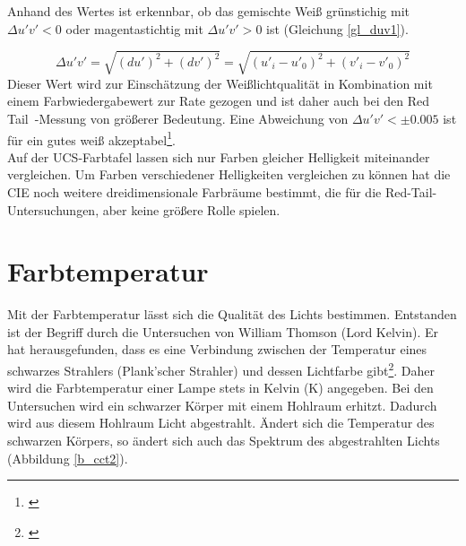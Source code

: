 \noindent Anhand des Wertes ist erkennbar, ob das gemischte Weiß grünstichig mit $\Delta u'v' < 0$ oder magentastichtig mit $\Delta u'v' > 0$ ist (Gleichung \ref{gl_duv1}).

\begin{equation}\label{gl_duv1}
		\Delta u'v'=\sqrt{(du')^{2}+(dv')^{2}}=\sqrt{(u'_{i}-u'_{0})^{2}+(v'_{i}-v'_{0})^{2}}
\end{equation}
Dieser Wert wird zur Einschätzung der Weißlichtqualität in Kombination mit einem Farbwiedergabewert zur Rate gezogen und ist daher auch bei den \glqq Red Tail\grqq\ -Messung von größerer Bedeutung. Eine Abweichung von $\Delta u'v' < \pm 0.005$ ist für ein gutes weiß akzeptabel\footnote{\cite{ohno}}.\\
Auf der UCS-Farbtafel lassen sich nur Farben gleicher Helligkeit miteinander vergleichen. Um Farben verschiedener Helligkeiten vergleichen zu können hat die CIE noch weitere dreidimensionale Farbräume bestimmt, die für die Red-Tail-Untersuchungen, aber keine größere Rolle spielen.\newpage

\chapter{Farbtemperatur} \label{sec_farbtemperatur}
Mit der Farbtemperatur lässt sich die Qualität des Lichts 
bestimmen. Entstanden ist der Begriff durch die Untersuchen von William Thomson (Lord Kelvin). Er hat herausgefunden, dass es eine Verbindung zwischen der Temperatur eines schwarzes Strahlers (Plank'scher Strahler) und dessen Lichtfarbe gibt\footnote{\cite[89]{mueller}}. Daher wird die Farbtemperatur einer Lampe stets in Kelvin (K) angegeben. Bei den Untersuchen wird ein schwarzer Körper mit einem Hohlraum erhitzt. Dadurch wird aus diesem Hohlraum Licht abgestrahlt. Ändert sich die Temperatur des schwarzen Körpers, so ändert sich auch das Spektrum des abgestrahlten Lichts (Abbildung \ref{b_cct2}).

